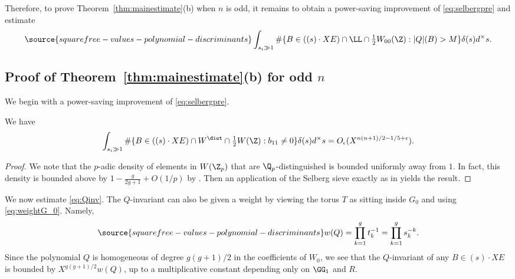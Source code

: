 Therefore, to prove Theorem~\ref{thm:mainestimate}(b) when $n$ is odd, it remains to obtain a power-saving improvement of \eqref{eq:selbergpre} and estimate
\begin{equation}\label{eq:Qinv}
\source{squarefree-values-polynomial-discriminants}
\int_{s_i\gg 1} \#\{B\in ((s)\cdot XE)\cap \LL\cap
{\textstyle\frac12} W_{00}(\Z):|Q|(B)>M\}\delta(s)d^\times s.
\end{equation}


\subsection{Proof of Theorem~\ref{thm:mainestimate}(b)
  for odd $n$}\label{sgomodd}

We begin with a power-saving improvement of \eqref{eq:selbergpre}.

\begin{proposition}
\notready\label{propodd}
  We have
  \begin{equation*}
\int_{s_i\gg 1} \#\{B\in ((s)\cdot XE)\cap W^\dist \cap {\textstyle\frac12} W(\Z): b_{11}\neq 0\}\delta(s)d^\times s =O_\epsilon(X^{n(n+1)/2-1/5+\epsilon}).
  \end{equation*}
\end{proposition}
\begin{proof}
We note that the $p$-adic density of elements in $W(\Z_p)$ that are
$\Q_p$-distinguished is bounded uniformly away from $1$. In fact, this
density is bounded above by $1 - \frac{g}{2g+1}+O(1/p)$ by
\cite[\S10.7]{BG2}.  Then an application of the Selberg sieve exactly
as in \cite{ShTs} yields the result.
\end{proof}

We now estimate \eqref{eq:Qinv}. The $Q$-invariant can also be
given a weight by viewing the torus $T$ as sitting inside $G_0$ and
using \eqref{eq:weightG_0}. Namely,
\begin{equation}\label{eqQweight}
\source{squarefree-values-polynomial-discriminants}
w(Q)=\prod_{k=1}^gt_k^{-1}=\prod_{k=1}^gs_k^{-k}.
\end{equation}
Since the polynomial $Q$ is homogeneous of degree $g(g+1)/2$ in the
coefficients of $W_0$, we see that the $Q$-invariant of any $B\in
(s)\cdot XE$ is bounded by $X^{g(g+1)/2}w(Q)$, up to a multiplicative
constant depending only on $\GG_1$ and $R$.

